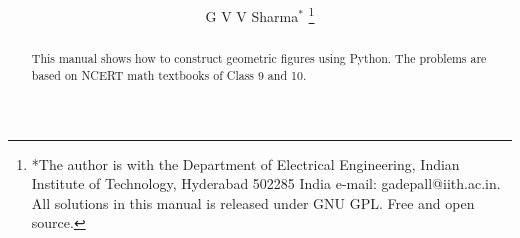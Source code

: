 \documentclass[journal,12pt,twocolumn]{IEEEtran}
\renewcommand\thesection{\arabic{section}}
\begin{document}
\let\StandardTheFigure\thefigure
\renewcommand{\thefigure}{\thesection}



\makeatletter
{}
\makeatother

\let\StandardTheFigure\thefigure
\let\StandardTheTable\thetable
\let\vec\mathbf





\def\putbox#1#2#3{\makebox[0in][l]{\makebox[#1][l]{}\raisebox{\baselineskip}[0in][0in]{\raisebox{#2}[0in][0in]{#3}}}}
     \def\rightbox#1{\makebox[0in][r]{#1}}
     \def\centbox#1{\makebox[0in]{#1}}
     \def\topbox#1{\raisebox{-\baselineskip}[0in][0in]{#1}}
     \def\midbox#1{\raisebox{-0.5\baselineskip}[0in][0in]{#1}}

\vspace{3cm}

\title{ 
}

\author{ G V V Sharma$^{*}$%
	\thanks{*The author is with the Department
		of Electrical Engineering, Indian Institute of Technology, Hyderabad
		502285 India e-mail:  gadepall@iith.ac.in. All solutions in this manual is released under GNU 
GPL.  Free and open source.}
	
}	

\maketitle

\tableofcontents

\bigskip

\renewcommand{\thefigure}{\theenumi}
\renewcommand{\thetable}{\theenumi}

\begin{abstract}
This manual shows how to construct geometric figures using Python. The problems are based on  NCERT math 
textbooks of 
Class 9 and 10.
\end{abstract}
\end{document}
